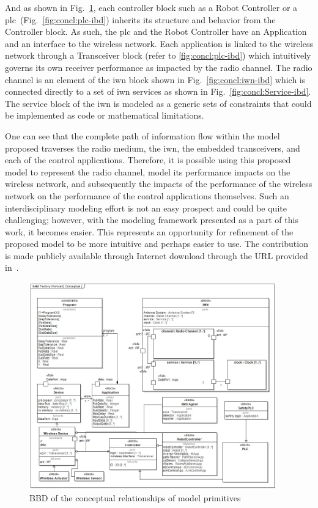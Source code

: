 And as shown in Fig.~\ref{fig:concl:conceptual}, each controller block such as a Robot Controller or a \gls{plc}~(Fig.~\ref{fig:concl:plc-ibd}) inherits its structure and behavior from the Controller block.  As such, the \gls{plc} and the Robot Controller have an Application and an interface to the wireless network.  Each application is linked to the wireless network through a Transceiver block (refer to \ref{fig:concl:plc-ibd}) which intuitively governs its own receiver performance as impacted by the radio channel.  The radio channel is an element of the \gls{iwn} block shown in Fig.~\ref{fig:concl:iwn-ibd} which is connected directly to a set of \gls{iwn} services as shown in Fig.~\ref{fig:concl:Service-ibd}. The service block of the \gls{iwn} is modeled as a generic sets of constraints that could be implemented as code or mathematical limitations.  

One can see that the complete path of information flow within the model proposed traverses the radio medium, the \gls{iwn}, the embedded transceivers, and each of the control applications. Therefore, it is possible using this proposed model to represent the radio channel, model its performance impacts on the wireless network, and subsequently the impacts of the performance of the wireless network on the performance of the control applications themselves.  Such an interdisciplinary modeling effort is not an easy prospect and could be quite challenging; however, with the modeling framework presented as a part of this work, it becomes easier.  This represents an opportunity for refinement of the proposed model to be more intuitive and perhaps easier to use.  The contribution is made publicly available through Internet download through the URL provided in~\cite{Candell2018SysML.DATA}.

\begin{figure}[!th]
	\centering
	\includegraphics[width=0.95\textwidth]{chapter-conclusions/images/Conceptual}
	\caption{BBD of the conceptual relationships of model primitives}
	\label{fig:concl:conceptual}
\end{figure}

